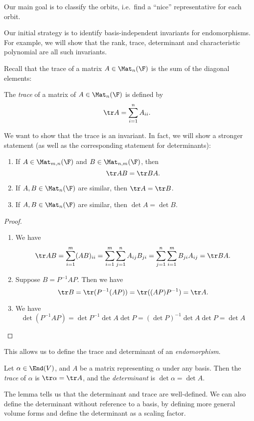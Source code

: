 \documentclass[a4paper]{article}
\begin{document}
Our main goal is to classify the orbits, i.e.\ find a ``nice'' representative for each orbit.

Our initial strategy is to identify basis-independent invariants for endomorphisms. For example, we will show that the rank, trace, determinant and characteristic polynomial are all such invariants.

Recall that the trace of a matrix $A \in \Mat_n(\F)$ is the sum of the diagonal elements:
\begin{defi}[Trace]
  The \emph{trace} of a matrix of $A \in \Mat_n(\F)$ is defined by
  \[
    \tr A = \sum_{i = 1}^n A_{ii}.
  \]
\end{defi}

We want to show that the trace is an invariant. In fact, we will show a stronger statement (as well as the corresponding statement for determinants):
\begin{lemma}\leavevmode
  \begin{enumerate}
    \item If $A \in \Mat_{m, n}(\F)$ and $B\in \Mat_{n, m}(\F)$, then
      \[
        \tr AB = \tr BA.
      \]
    \item If $A, B \in \Mat_n(\F)$ are similar, then $\tr A = \tr B$.
    \item If $A, B \in \Mat_n(\F)$ are similar, then $\det A = \det B$.
  \end{enumerate}
\end{lemma}

\begin{proof}\leavevmode
  \begin{enumerate}
    \item We have
      \[
        \tr AB = \sum_{i = 1}^m (AB)_{ii} = \sum_{i = 1}^m \sum_{j = 1}^n A_{ij}B_{ji} = \sum_{j = 1}^n \sum_{i = 1}^m B_{ji}A_{ij} = \tr BA.
      \]
    \item Suppose $B = P^{-1}AP$. Then we have
      \[
        \tr B = \tr (P^{-1}(AP)) = \tr ((AP)P^{-1}) = \tr A.
      \]
    \item We have
      \[
        \det (P^{-1}AP) = \det P^{-1} \det A \det P = (\det P)^{-1} \det A \det P = \det A
      \]
  \end{enumerate}
\end{proof}
This allows us to define the trace and determinant of an \emph{endomorphism}.
\begin{defi}
  Let $\alpha \in \End(V)$, and $A$ be a matrix representing $\alpha$ under any basis. Then the \emph{trace} of $\alpha$ is $\tr \alpha = \tr A$, and the \emph{determinant} is $\det \alpha = \det A$.
\end{defi}
The lemma tells us that the determinant and trace are well-defined. We can also define the determinant without reference to a basis, by defining more general volume forms and define the determinant as a scaling factor.
\end{document}
